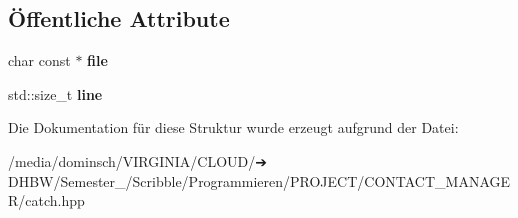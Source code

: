 \subsection*{Öffentliche Attribute}
\begin{DoxyCompactItemize}
\item 
\mbox{\label{structCatch_1_1SourceLineInfo_ad65537703e9f08c1fa7777fbc3f0c617}} 
char const  $\ast$ {\bfseries file}
\item 
\mbox{\label{structCatch_1_1SourceLineInfo_a841e5d696c7b9cde24e45e61dd979c77}} 
std\+::size\+\_\+t {\bfseries line}
\end{DoxyCompactItemize}


Die Dokumentation für diese Struktur wurde erzeugt aufgrund der Datei\+:\begin{DoxyCompactItemize}
\item 
/media/dominsch/\+V\+I\+R\+G\+I\+N\+I\+A/\+C\+L\+O\+U\+D/➔ D\+H\+B\+W/\+Semester\+\_/\+Scribble/\+Programmieren/\+P\+R\+O\+J\+E\+C\+T/\+C\+O\+N\+T\+A\+C\+T\+\_\+\+M\+A\+N\+A\+G\+E\+R/catch.\+hpp\end{DoxyCompactItemize}
